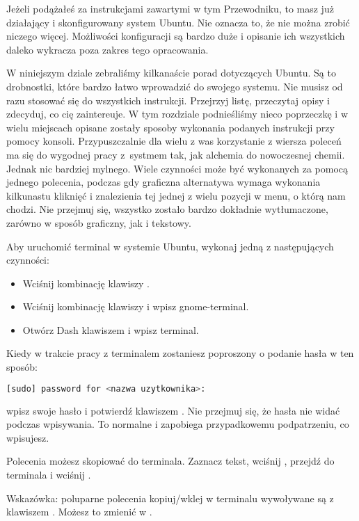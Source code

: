 Jeżeli podążałeś za instrukcjami zawartymi w tym Przewodniku, to masz już działający i skonfigurowany system Ubuntu. Nie oznacza to, że nie można zrobić niczego więcej. Możliwości konfiguracji są bardzo duże i opisanie ich wszystkich daleko wykracza poza zakres tego opracowania.

W niniejszym dziale zebraliśmy kilkanaście porad dotyczących Ubuntu. Są to drobnostki, które bardzo łatwo wprowadzić do swojego systemu. Nie musisz od razu stosować się do wszystkich instrukcji. Przejrzyj listę, przeczytaj opisy i zdecyduj, co cię zaintereuje. W tym rozdziale podnieśliśmy nieco poprzeczkę i w wielu miejscach opisane zostały sposoby wykonania podanych instrukcji przy pomocy konsoli. Przypuszczalnie dla wielu z was korzystanie z wiersza poleceń ma się do wygodnej pracy z~systmem tak, jak alchemia do nowoczesnej chemii. Jednak nic bardziej mylnego. Wiele czynności może być wykonanych za pomocą jednego polecenia, podczas gdy graficzna alternatywa wymaga wykonania kilkunastu kliknięć i znalezienia tej jednej z wielu pozycji w menu, o którą nam chodzi. Nie przejmuj się, wszystko zostało bardzo dokładnie wytłumaczone, zarówno w sposób graficzny, jak i tekstowy.

Aby uruchomić terminal w systemie Ubuntu, wykonaj jedną z następujących czynności:
\begin{itemize}
\item Wciśnij kombinację klawiszy .
\item Wciśnij kombinację klawiszy  i wpisz \textcolor{ubuntu_orange}{gnome-terminal}.
\item Otwórz Dash klawiszem  i wpisz \textcolor{ubuntu_orange}{terminal}.
\end{itemize}

Kiedy w trakcie pracy z terminalem zostaniesz poproszony o podanie hasła w ten sposób:
\begin{lstlisting}[language=bash]
[sudo] password for <nazwa uzytkownika>:
\end{lstlisting}
\noindent wpisz swoje hasło i potwierdź klawiszem \keys{\returnwin}. Nie przejmuj się, że hasła nie widać podczas wpisywania. To normalne i zapobiega przypadkowemu podpatrzeniu, co wpisujesz.

Polecenia możesz skopiować do terminala. Zaznacz tekst, wciśnij , przejdź do terminala i wciśnij .

Wskazówka: poluparne polecenia kopiuj/wklej w terminalu wywoływane są z klawiszem . Możesz to zmienić w .

